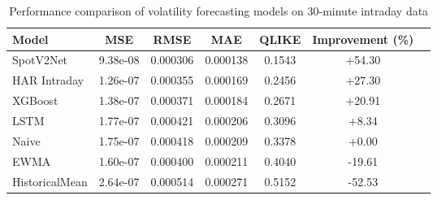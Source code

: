 \documentclass[journal]{IEEEtran}
\begin{document}
\begin{table}[!t]
\centering
\caption{Performance comparison of volatility forecasting models on 30-minute intraday data}
\label{tab:main_results}
\begin{tabular}{@{}lcccccc@{}}
\toprule
Model & MSE & RMSE & MAE & QLIKE & Improvement (\%) \\
\midrule
SpotV2Net & 9.38e-08 & 0.000306 & 0.000138 & 0.1543 & +54.30 \\
HAR Intraday & 1.26e-07 & 0.000355 & 0.000169 & 0.2456 & +27.30 \\
XGBoost & 1.38e-07 & 0.000371 & 0.000184 & 0.2671 & +20.91 \\
LSTM & 1.77e-07 & 0.000421 & 0.000206 & 0.3096 & +8.34 \\
\rowcolor{bestcolor}Naive & 1.75e-07 & 0.000418 & 0.000209 & 0.3378 & +0.00 \\
EWMA & 1.60e-07 & 0.000400 & 0.000211 & 0.4040 & -19.61 \\
HistoricalMean & 2.64e-07 & 0.000514 & 0.000271 & 0.5152 & -52.53 \\
\bottomrule
\end{tabular}
\end{table}
\end{document}
